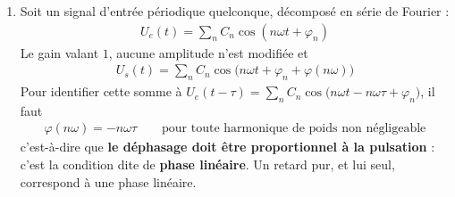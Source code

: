 \begin{correction}
\begin{enumerate}
	\textbf{Cas $\omega=10^{-2}\omega_0$.} Les deux harmoniques sont maintenant à $\omega$ et $3\omega$, toutes deux très inférieures à $\omega_0$. On peut linéariser l'arctangente ($\arctan u\simeq u$ pour $u\ll1$, avec une erreur relative $u^2/3$, ici au plus $3\times10^{-4}$) :
	\begin{align*}
		\varphi(\omega)\simeq-\frac{2\omega}{\omega_0}=-2RC\omega
		\qquad\text{et}\qquad
		\varphi(3\omega)\simeq-6RC\omega
	\end{align*}
	Chaque déphasage est cette fois \textit{proportionnel} à la pulsation de l'harmonique, ce qui permet de factoriser :
	\begin{align*}
		U_s(t)&\simeq\frac{3U_0}{4}\cos\big(\omega(t-2RC)\big)+\frac{U_0}{4}\cos\big(3\omega(t-2RC)\big)\\
		&=\boxed{U_e(t-2RC)}
	\end{align*}
	Les deux harmoniques subissent le \textit{même} retard $\tau=2RC$ : le signal ressort identique à lui-même, simplement décalé dans le temps.

	\textit{Application numérique : $\omega=10^{2}$~rad$\cdot$s$^{-1}$, soit $f=16$~Hz et $T=63$~ms, pour un retard $\tau=2RC=0,20$~ms. Le retard ne représente que $0,3$~\% de la période : à l'oscilloscope, la sortie est pratiquement confondue avec l'entrée.}

	\textit{Remarque pour le colleur : l'erreur classique est de conclure « le signal est retardé de $2\times10^{-2}$ ». C'est un \textit{angle} (le déphasage du fondamental, en radians), pas une durée. Le retard, lui, vaut $\tau=2RC$ et ne dépend pas de $\omega$, ce qui est précisément la raison pour laquelle il n'y a pas de déformation.}

	\item Soit un signal d'entrée périodique quelconque, décomposé en série de Fourier :
	\begin{align*}
		U_e(t)=\sum_n C_n\cos(n\omega t+\varphi_n)
	\end{align*}
	Le gain valant $1$, aucune amplitude n'est modifiée et
	\begin{align*}
		U_s(t)=\sum_n C_n\cos\big(n\omega t+\varphi_n+\varphi(n\omega)\big)
	\end{align*}
	Pour identifier cette somme à $U_e(t-\tau)=\sum_n C_n\cos\big(n\omega t-n\omega\tau+\varphi_n\big)$, il faut
	\begin{align*}
		\varphi(n\omega)=-n\omega\tau \qquad\text{pour toute harmonique de poids non négligeable}
	\end{align*}
	c'est-à-dire que \textbf{le déphasage doit être proportionnel à la pulsation} : c'est la condition dite de \textbf{phase linéaire}. Un retard pur, et lui seul, correspond à une phase linéaire.


\end{enumerate}
\end{correction}
